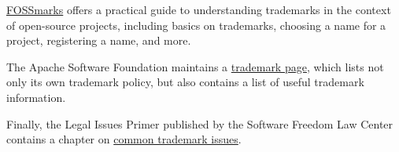 \begin{kaobox}[frametitle=Trademark resources]

\href{https://fossmarks.org/}{FOSSmarks} offers a practical guide to understanding trademarks in the context of open-source projects, including basics on trademarks, choosing a name for a project, registering a name, and more.

The Apache Software Foundation maintains a \href{https://www.apache.org/foundation/marks/resources}{trademark page}, which lists not only its own trademark policy, but also contains a list of useful trademark information.

Finally, the Legal Issues Primer published by the Software Freedom Law Center contains a chapter on \href{https://www.softwarefreedom.org/resources/2008/foss-primer.html#x1-600005}{common trademark issues}.

\end{kaobox}

